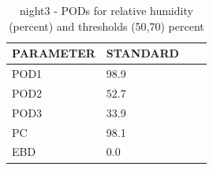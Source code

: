 \begin{table}[p!]
\begin{center}
\begin{tabular}{|l|l|l|l|}
\hline
\multicolumn{1}{|c|}{\cellcolor[HTML]{C0C0C0}\textbf{PARAMETER}} & \multicolumn{1}{c|}{\cellcolor[HTML]{C0C0C0}\textbf{STANDARD}}  \\
\hline
\cellcolor[HTML]{C0C0C0}POD1  & 98.9                                \\
\cellcolor[HTML]{C0C0C0}POD2  & 52.7                                \\
\cellcolor[HTML]{C0C0C0}POD3  & 33.9                                \\
\cellcolor[HTML]{C0C0C0}PC    & 98.1                                \\
\cellcolor[HTML]{C0C0C0}EBD   & 0.0                                \\
\hline
\end{tabular}
\caption{night3 - PODs for relative humidity (percent) and thresholds (50,70) percent}
\label{tab:podrhFT:night3}
\end{center}
\end{table}
